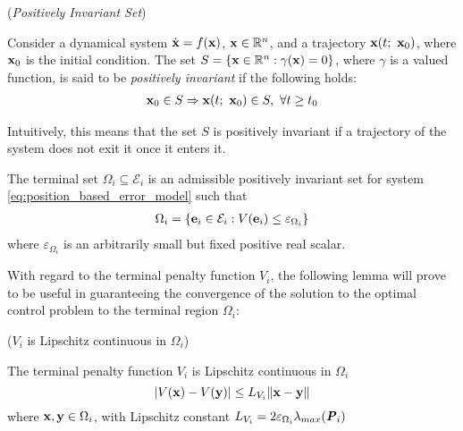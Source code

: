 \begin{bw_box}
  \begin{definition} (\textit{Positively Invariant Set})
    \label{def:positively_invariant}

    Consider a dynamical system $\dot{\bm{\mathbf{x}}} = f(\bm{\mathbf{x}})$,
    $\bm{\mathbf{x}} \in \mathbb{R}^n$, and a trajectory $\bm{\mathbf{x}}(t;\ \bm{\mathbf{x}}_0)$,
    where $\bm{\mathbf{x}}_0$ is the initial condition. The set
    $S = \{\bm{\mathbf{x}} \in \mathbb{R}^n : \gamma(\bm{\mathbf{x}}) = 0\}$, where
    $\gamma$ is a valued function, is said to be \textit{positively invariant}
    if the following holds:
    \begin{align}
      \vect{x}_0 \in S \Rightarrow \vect{x}(t;\ \vect{x}_0) \in S,\ \forall t \geq t_0
    \end{align}

    Intuitively, this means that the set $S$ is positively invariant if a
    trajectory of the system does not exit it once it enters it.
  \end{definition}
\end{bw_box}

The terminal set $\Omega_i \subseteq \mathcal{E}_i$ is an admissible
positively invariant set for system \eqref{eq:position_based_error_model}
such that
\begin{align}
  \Omega_i = \{\bm{\mathbf{e}}_i \in \mathcal{E}_i : V(\bm{\mathbf{e}}_i) \leq \varepsilon_{\Omega_i} \}
\end{align}
where $\varepsilon_{\Omega_i}$ is an arbitrarily small but fixed positive real scalar.

With regard to the terminal penalty function $V_i$, the following lemma will
prove to be useful in guaranteeing the convergence of the solution to the
optimal control problem to the terminal region $\Omega_i$:

\begin{bw_box}
\begin{lemma} ($V_i$ is Lipschitz continuous in $\Omega_i$)
\label{lemma:V_Lipschitz_e_0}

  The terminal penalty function $V_i$ is Lipschitz continuous in
  $\Omega_i$
  $$|V(\bm{\mathbf{x}}) - V(\bm{\mathbf{y}})| \leq L_{V_i} \|\bm{\mathbf{x}} - \bm{\mathbf{y}}\|$$
  where $\bm{\mathbf{x}}, \bm{\mathbf{y}} \in \Omega_i$,
  with Lipschitz constant $L_{V_i} = 2 \varepsilon_{\Omega_i} \lambda_{max}(\bm{\mathit{P}}_i)$\\[2.5ex]

\end{lemma}
\end{bw_box}


